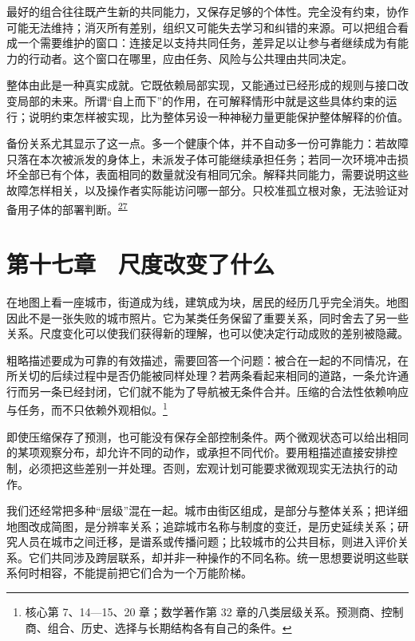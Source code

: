 \documentclass[
  11pt,
  oneside]{book}
\begin{document}
最好的组合往往既产生新的共同能力，又保存足够的个体性。完全没有约束，协作可能无法维持；消灭所有差别，组织又可能失去学习和纠错的来源。可以把组合看成一个需要维护的窗口：连接足以支持共同任务，差异足以让参与者继续成为有能力的行动者。这个窗口在哪里，应由任务、风险与公共理由共同决定。

整体由此是一种真实成就。它既依赖局部实现，又能通过已经形成的规则与接口改变局部的未来。所谓``自上而下''的作用，在可解释情形中就是这些具体约束的运行；说明约束怎样被实现，比为整体另设一种神秘力量更能保护整体解释的价值。

\begingroup{}

备份关系尤其显示了这一点。多一个健康个体，并不自动多一份可靠能力：若故障只落在本次被派发的身体上，未派发子体可能继续承担任务；若同一次环境冲击损坏全部已有个体，表面相同的数量就没有相同冗余。解释共同能力，需要说明这些故障怎样相关，以及操作者实际能访问哪一部分。只校准孤立根对象，无法验证对备用子体的部署判断。\textsuperscript{\hyperlink{ph-note-27}{27}}

\par\endgroup

\chapter{第十七章　尺度改变了什么}\label{ph-ch-17}

在地图上看一座城市，街道成为线，建筑成为块，居民的经历几乎完全消失。地图因此不是一张失败的城市照片。它为某类任务保留了重要关系，同时舍去了另一些关系。尺度变化可以使我们获得新的理解，也可以使决定行动成败的差别被隐藏。

粗略描述要成为可靠的有效描述，需要回答一个问题：被合在一起的不同情况，在所关切的后续过程中是否仍能被同样处理？若两条看起来相同的道路，一条允许通行而另一条已经封闭，它们就不能为了导航被无条件合并。压缩的合法性依赖响应与任务，而不只依赖外观相似。\footnote{\hypertarget{ph-note-42}{}核心第 7、14---15、20 章；数学著作第 32 章的八类层级关系。预测商、控制商、组合、历史、选择与长期结构各有自己的条件。}

即使压缩保存了预测，也可能没有保存全部控制条件。两个微观状态可以给出相同的某项观察分布，却允许不同的动作，或承担不同代价。要用粗描述直接安排控制，必须把这些差别一并处理。否则，宏观计划可能要求微观现实无法执行的动作。

我们还经常把多种``层级''混在一起。城市由街区组成，是部分与整体关系；把详细地图改成简图，是分辨率关系；追踪城市名称与制度的变迁，是历史延续关系；研究人员在城市之间迁移，是谱系或传播问题；比较城市的公共目标，则进入评价关系。它们共同涉及跨层联系，却并非一种操作的不同名称。统一思想要说明这些联系何时相容，不能提前把它们合为一个万能阶梯。
\end{document}
